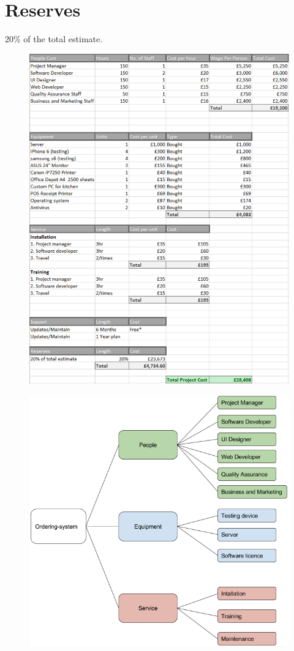 \documentclass[11pt, a4paper]{report}
\begin{document}
\section{Reserves} 
20\% of the total estimate.
\pagebreak 
\begin{figure}
\centering
\includegraphics[scale=0.9]{Figures/Costing.png}
\end{figure}
\pagebreak 
\begin{figure}
\centering
\includegraphics[scale=0.8]{Figures/CostingBreakdown.png}
\end{figure}
\end{document}
